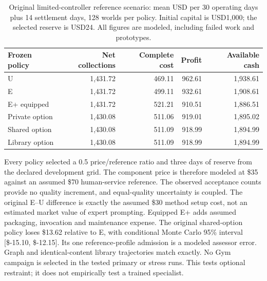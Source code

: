 \begin{table}[H]\centering\small
\begin{tabular}{@{}lrrrr@{}}\toprule
Frozen policy & Net collections & Complete cost & Profit & Available cash \\ \midrule
U & 1,431.72 & 469.11 & 962.61 & 1,938.61 \\
E & 1,431.72 & 499.11 & 932.61 & 1,908.61 \\
E+ equipped & 1,431.72 & 521.21 & 910.51 & 1,886.51 \\
Private option & 1,430.08 & 511.06 & 919.01 & 1,895.02 \\
Shared option & 1,430.08 & 511.09 & 918.99 & 1,894.99 \\
Library option & 1,430.08 & 511.09 & 918.99 & 1,894.99 \\
\bottomrule\end{tabular}
\caption{Original limited-controller reference scenario: mean USD per 30 operating days plus 14 settlement days, 128 worlds per policy. Initial capital is USD1,000; the selected reserve is USD24. All figures are modeled, including failed work and prototypes.}
\end{table}
Every policy selected a 0.5 price/reference ratio and three days of reserve from the declared development grid. The component price is therefore modeled at \$35 against an assumed \$70 human-service reference. The observed acceptance counts provide no quality increment, and equal-quality uncertainty is coupled. The original E--U difference is exactly the assumed \$30 method setup cost, not an estimated market value of expert prompting. Equipped E+ adds assumed packaging, invocation and maintenance expense. The original shared-option policy loses \$13.62 relative to E, with conditional Monte Carlo 95\% interval [\$-15.10, \$-12.15]. Its one reference-profile admission is a modeled assessor error. Graph and identical-content library trajectories match exactly. No Gym campaign is selected in the tested primary or stress runs. This tests optional restraint; it does not empirically test a trained specialist.

